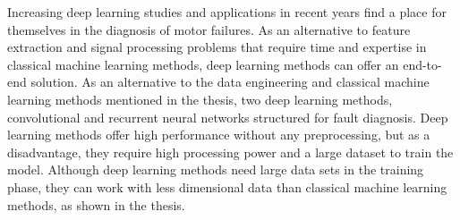 Increasing deep learning studies and applications in recent years find a place for themselves in the diagnosis of motor failures. As an alternative to feature extraction and signal processing problems that require time and expertise in classical machine learning methods, deep learning methods can offer an end-to-end solution. As an alternative to the data engineering and classical machine learning methods mentioned in the thesis, two deep learning methods, convolutional and recurrent neural networks structured for fault diagnosis. Deep learning methods offer high performance without any preprocessing, but as a disadvantage, they require high processing power and a large dataset to train the model. Although deep learning methods need large data sets in the training phase, they can work with less dimensional data than classical machine learning methods, as shown in the thesis.